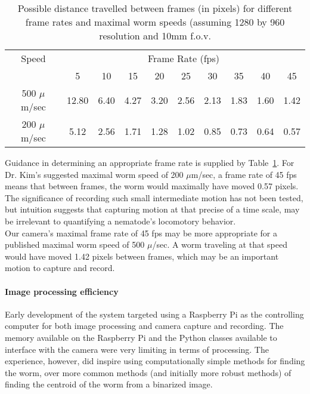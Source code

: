 \documentclass[main.tex]{subfiles}
\begin{document}
\begin{table}[!htbp]
  \centering
  \begin{tabular}{cccccccccc}
\toprule
Speed & \multicolumn{9}{c}{Frame Rate (fps)} \\
\cmidrule(lr){2-10}
{}           &  5  &  10  &  15  &  20  &  25  &  30  &  35  &  40  &  45  \\
\cmidrule(lr){2-10}
500 $\mu$m/sec & 12.80 & 6.40 & 4.27 & 3.20 & 2.56 & 2.13 & 1.83 & 1.60 & 1.42 \\
200 $\mu$m/sec & 5.12 & 2.56 & 1.71 & 1.28 & 1.02 & 0.85 & 0.73 & 0.64 & 0.57 \\
\bottomrule
  \end{tabular}
  \caption{Possible distance travelled between frames (in pixels) for different frame rates and maximal worm speeds (assuming 1280 by 960 resolution and 10mm f.o.v.}
  \label{tab:fr}
\end{table}

Guidance in determining an appropriate frame rate is supplied by Table~\ref{tab:fr}. For Dr. Kim's suggested maximal worm speed of 200 $\mu$m/sec, a frame rate of 45 fps means that between frames, the worm would maximally have moved 0.57 pixels. The significance of recording such small intermediate motion has not been tested, but intuition suggests that capturing motion at that precise of a time scale, may be irrelevant to quantifying a nematode's locomotory behavior. \\

Our camera's maximal frame rate of 45 fps may be more appropriate for a published \cite{feng2004} maximal worm speed of 500 $\mu$/sec. A worm traveling at that speed would have moved 1.42 pixels between frames, which may be an important motion to capture and record. 

\paragraph{Image processing efficiency}
Early development of the system targeted using a Raspberry Pi as the controlling computer for both image processing and camera capture and recording. The memory available on the Raspberry Pi and the Python classes available to interface with the camera were very limiting in terms of processing. The experience, however, did inspire using computationally simple methods for finding the worm, over more common methods (and initially more robust methods) of finding the centroid of the worm from a binarized image. \\
\end{document}
